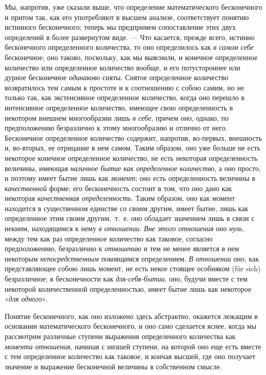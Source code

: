 {Мы, напротив, уже сказали выше, что определение математического бесконечного
и притом так, как его употребляют в высшем анализе, соответствует понятию
истинного бесконечного; теперь мы предпримем сопоставление этих двух
определений в более развернутом виде. — Что касается, прежде всего, истинно
бесконечного определенного количества, то оно определилось как
{\em в самом себе} бесконечное; оно таково, поскольку,
как мы выяснили, и конечное определенное количество или определенное
количество вообще, и его потустороннее или дурное бесконечное
{\em одинаково} сняты. Снятое определенное количество
возвратилось тем самым к простоте и к соотношению с собою самим, но не
только так, как экстенсивное определенное количество, когда оно перешло в
интенсивное определенное количество, имеющее свою определенность в
некотором внешнем многообразии лишь {\em в себе},
причем оно, однако, по предположению безразлично к этому многообразию и
отлично от него. Бесконечное определенное количество содержит, напротив,
во-первых, внешность и, во-вторых, ее отрицание в нем самом. Таким образом,
оно уже больше не есть некоторое конечное определенное количество, не есть
некоторая определенность величины, имеющая
{\em наличное бытие как определенное количество}, а оно
просто, и поэтому имеет бытие лишь как {\em момент};
оно есть определенность величины в {\em качественной}
форме; его бесконечность состоит в том, что оно дано как некоторая
{\em качественная определенность}. Таким образом, оно
как момент находится в существенном единстве со своим другим, имеет бытие,
лишь как определенное этим своим другим,~т.~е. оно обладает значением лишь
в связи с некиим, находящимся к нему {\em в отношении}.
{\em Вне этого отношения} оно
{\em нуль}, между тем как раз определенное количество
как таковое, согласно предположению, безразлично к
{\em отношению} и тем не менее является в нем некоторым
{\em непосредственным} покоящимся определением.
{\em В отношении} оно, как представляющее собою лишь
момент, не есть некое стоящее особняком (für sich) безразличное; в
бесконечности как {\em для-себя-бытии}, оно, будучи
вместе с тем некоторой количественной определенностью, имеет бытие лишь как
некоторое «{\em для одного}».

Понятие бесконечного, как оно изложено здесь абстрактно, окажется лежащим в
основании математического бесконечного, и оно само сделается яснее, когда
мы рассмотрим различные ступени выражения определенного количества как
{\em момента отношения}, начиная с низшей ступени, на
которой оно еще есть вместе с тем определенное количество как таковое, и
кончая высшей, где оно получает значение и выражение бесконечной величины в
собственном смысле.

}
